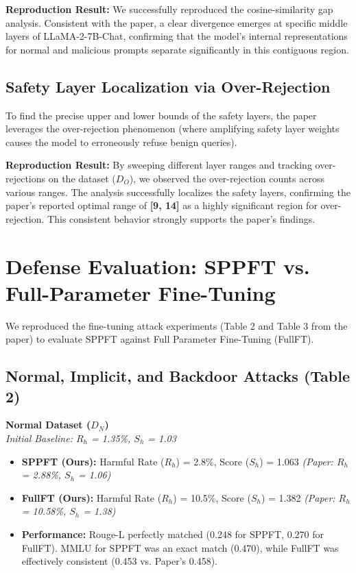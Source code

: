 \documentclass[11pt,a4paper]{article}
\begin{document}
\noindent\textbf{Reproduction Result:} We successfully reproduced the cosine-similarity gap analysis. Consistent with the paper, a clear divergence emerges at specific middle layers of LLaMA-2-7B-Chat, confirming that the model's internal representations for normal and malicious prompts separate significantly in this contiguous region.

\subsection{Safety Layer Localization via Over-Rejection}
To find the precise upper and lower bounds of the safety layers, the paper leverages the over-rejection phenomenon (where amplifying safety layer weights causes the model to erroneously refuse benign queries). 

\noindent\textbf{Reproduction Result:} By sweeping different layer ranges and tracking over-rejections on the dataset ($D_O$), we observed the over-rejection counts across various ranges. The analysis successfully localizes the safety layers, confirming the paper's reported optimal range of \textbf{{[9, 14]}} as a highly significant region for over-rejection. This consistent behavior strongly supports the paper's findings.

\section{Defense Evaluation: SPPFT vs. Full-Parameter Fine-Tuning}

We reproduced the fine-tuning attack experiments (Table 2 and Table 3 from the paper) to evaluate SPPFT against Full Parameter Fine-Tuning (FullFT). 

\subsection{Normal, Implicit, and Backdoor Attacks (Table 2)}

\noindent\textbf{Normal Dataset ($D_N$)} \\
\textit{Initial Baseline: $R_h$ = 1.35\%, $S_h$ = 1.03}
\begin{itemize}
    \item \textbf{SPPFT (Ours):} Harmful Rate ($R_h$) = 2.8\%, Score ($S_h$) = 1.063 \textit{(Paper: $R_h$ = 2.88\%, $S_h$ = 1.06)}
    \item \textbf{FullFT (Ours):} Harmful Rate ($R_h$) = 10.5\%, Score ($S_h$) = 1.382 \textit{(Paper: $R_h$ = 10.58\%, $S_h$ = 1.38)}
    \item \textbf{Performance:} Rouge-L perfectly matched (0.248 for SPPFT, 0.270 for FullFT). MMLU for SPPFT was an exact match (0.470), while FullFT was effectively consistent (0.453 vs. Paper's 0.458).
\end{itemize}
\end{document}

